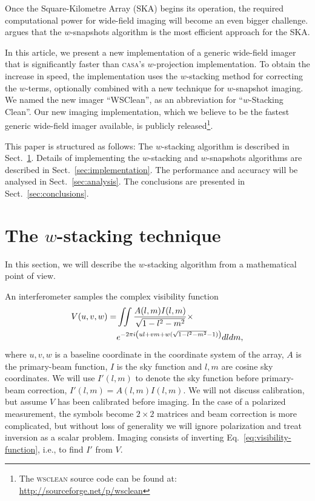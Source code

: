 \documentclass[useAMS,usenatbib]{mn2e}
\begin{document}
Once the Square-Kilometre Array (SKA) begins its operation, the required computational power for wide-field imaging will become an even bigger challenge. \citet{widefield-imaging-ska-cornwell} argues that the $w$-snapshots algorithm is the most efficient approach for the SKA.

In this article, we present a new implementation of a generic wide-field imager that is significantly faster than \textsc{casa}'s $w$-projection implementation. To obtain the increase in speed, the implementation uses the $w$-stacking method for correcting the $w$-terms, optionally combined with a new technique for $w$-snapshot imaging. We named the new imager ``WSClean'', as an abbreviation for ``$w$-Stacking Clean''. Our new imaging implementation, which we believe to be the fastest generic wide-field imager available, is publicly released\footnote{The \textsc{wsclean} source code can be found at:\\\href{http://sourceforge.net/p/wsclean}{http://sourceforge.net/p/wsclean}}.

This paper is structured as follows: The $w$-stacking algorithm is described in Sect.~\ref{sec:wstacking}. Details of implementing the $w$-stacking and $w$-snapshots algorithms are described in Sect.~\ref{sec:implementation}. The performance and accuracy will be analysed in Sect.~\ref{sec:analysis}. The conclusions are presented in Sect.~\ref{sec:conclusions}.

\section{The $w$-stacking technique} \label{sec:wstacking}
In this section, we will describe the $w$-stacking algorithm from a mathematical point of view.

An interferometer samples the complex visibility function
\begin{align}\notag
V(u,v,w) = & \iint \frac{A(l,m) I(l,m)}{\sqrt{1-l^2-m^2}} \times \\ \label{eq:visibility-function}
& e^{-2\pi i \left(ul + vm + w(\sqrt{1-l^2-m^2}-1)\right)} dl dm,
\end{align}
where $u,v,w$ is a baseline coordinate in the coordinate system of the array, $A$ is the primary-beam function, $I$ is the sky function and $l,m$ are cosine sky coordinates. We will use $I'(l,m)$ to denote the sky function before primary-beam correction, $I'(l,m)=A(l,m)I(l,m)$. We will not discuss calibration, but assume $V$ has been calibrated before imaging. In the case of a polarized measurement, the symbols become $2\times 2$ matrices and beam correction is more complicated, but without loss of generality we will ignore polarization and treat inversion as a scalar problem. Imaging consists of inverting Eq.~\eqref{eq:visibility-function}, i.e., to find $I'$ from $V$.
\end{document}
